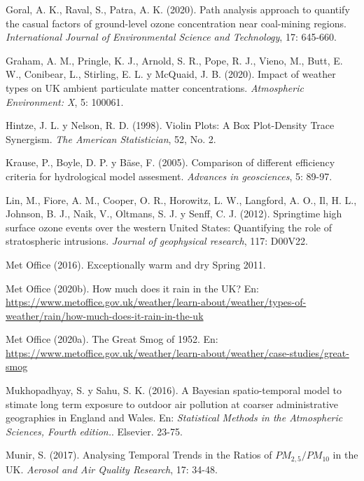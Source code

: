 \documentclass[12pt]{article}
\begin{document}
\begin{thebibliography}{99}
 Goral, A. K., Raval, S., Patra, A. K. (2020). Path analysis approach to quantify the casual factors of ground-level ozone concentration near coal-mining regions. \textit{International Journal of Environmental Science and Technology}, 17: 645-660.

 Graham, A. M., Pringle, K. J., Arnold, S. R., Pope, R. J., Vieno, M., Butt, E. W., Conibear, L., Stirling, E. L. y McQuaid, J. B. (2020). Impact of weather types on UK ambient particulate matter concentrations. \textit{Atmospheric Environment: X}, 5: 100061. 

 Hintze, J. L. y Nelson, R. D. (1998). Violin Plots: A Box Plot-Density Trace Synergism. \textit{The American Statistician}, 52, No. 2.

 Krause, P., Boyle, D. P. y Bäse, F. (2005). Comparison of different efficiency criteria for hydrological model assesment. \textit{Advances in geosciences}, 5: 89-97.

 Lin, M., Fiore, A. M., Cooper, O. R., Horowitz, L. W., Langford, A. O., Il, H. L., Johnson, B. J., Naik, V., Oltmans, S. J. y Senff, C. J. (2012). Springtime high surface ozone events over the western United States: Quantifying the role of stratospheric intrusions. \textit{Journal of geophysical research}, 117: D00V22.

 Met Office (2016). Exceptionally warm and dry Spring 2011.

 Met Office (2020b). How much does it rain in the UK? En: \href{https://www.metoffice.gov.uk/weather/learn-about/weather/types-of-weather/rain/how-much-does-it-rain-in-the-uk}{https://www.metoffice.gov.uk/weather/learn-about/weather/types-of-weather/rain/how-much-does-it-rain-in-the-uk}

 Met Office (2020a). The Great Smog of 1952. En: \href{https://www.metoffice.gov.uk/weather/learn-about/weather/case-studies/great-smog}{https://www.metoffice.gov.uk/weather/learn-about/weather/case-studies/great-smog}

 Mukhopadhyay, S. y Sahu, S. K. (2016). A Bayesian spatio-temporal model to stimate long term exposure to outdoor air pollution at coarser administrative geographies in England and Wales. En: \textit{Statistical Methods in the Atmospheric Sciences, Fourth edition.}. Elsevier. 23-75.

 Munir, S. (2017). Analysing Temporal Trends in the Ratios of $PM_{2,5}/PM_{10}$ in the UK. \textit{Aerosol and Air Quality Research}, 17: 34-48.


\end{thebibliography}
\end{document}
